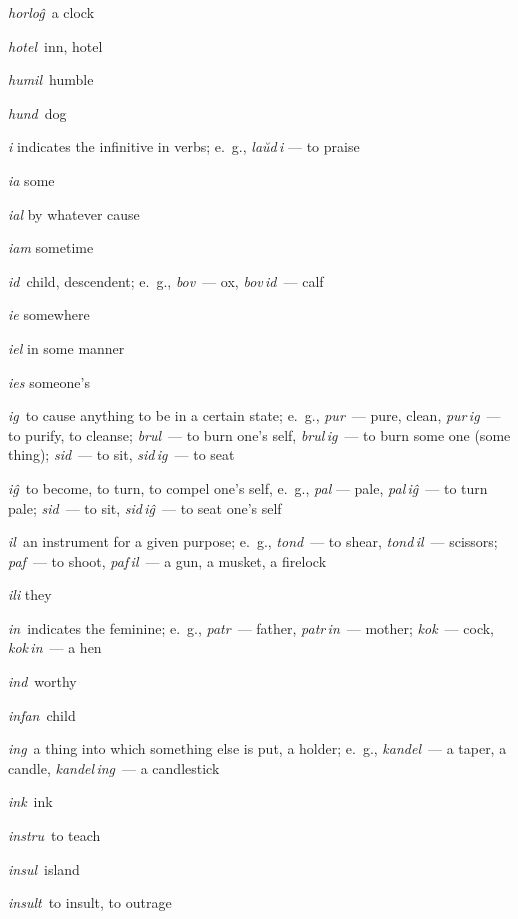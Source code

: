\begin{landscape}
\begin{multicols}{5}
\begin{outdent}{1em}
\emph{horloĝ\,} a clock

\emph{hotel\,} inn, hotel

\emph{humil\,} humble

\emph{hund\,} dog
\end{outdent}


\begin{outdent}{1em}
\emph{i} indicates the infinitive in verbs; e.~g., \emph{laŭd\,i} — to praise

\emph{ia} some

\emph{ial} by whatever cause

\emph{iam} sometime

\emph{id\,} child, descendent; e.~g., \emph{bov\,} — ox, \emph{bov\,id\,} — calf

\emph{ie} somewhere

\emph{iel} in some manner

\emph{ies} someone’s

\emph{ig\,} to cause anything to be in a certain state; e.~g., \emph{pur\,} — pure, clean, \emph{pur\,ig\,} — to purify, to cleanse; \emph{brul\,} — to burn one’s self, \emph{brul\,ig\,} — to burn some one (some thing); \emph{sid\,} — to sit, \emph{sid\,ig\,} — to seat

\emph{iĝ\,} to become, to turn, to compel one’s self, e.~g., \emph{pal} — pale, \emph{pal\,iĝ\,} — to turn pale; \emph{sid\,} — to sit, \emph{sid\,iĝ\,} — to seat one’s self

\emph{il\,} an instrument for a given purpose; e.~g., \emph{tond\,} — to shear, \emph{tond\,il\,} — scissors; \emph{paf\,} — to shoot, \emph{paf\,il\,} — a gun, a musket, a firelock

\emph{ili} they

\emph{in\,} indicates the feminine; e.~g., \emph{patr\,} — father, \emph{patr\,in\,} — mother; \emph{kok\,} — cock, \emph{kok\,in\,} — a hen

\emph{ind\,} worthy

\emph{infan\,} child

\emph{ing\,} a thing into which something else is put, a holder; e.~g., \emph{kandel\,} — a taper, a candle, \emph{kandel\,ing\,} — a candlestick

\emph{ink\,} ink

\emph{instru\,} to teach

\emph{insul\,} island

\emph{insult\,} to insult, to outrage


\end{outdent}
\end{multicols}
\end{landscape}
